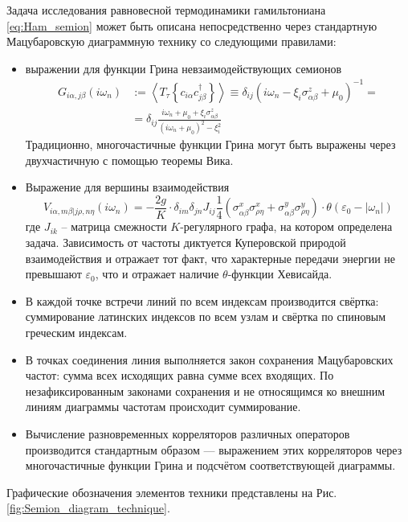 Задача исследования равновесной термодинамики гамильтониана \eqref{eq:Ham_semion} может быть  описана непосредственно через стандартную Мацубаровскую диаграммную технику \cite{AGD} со следующими правилами:
\begin{itemize}
	\item выражении для функции Грина невзаимодействующих семионов
	\begin{equation}
	\label{eq:Semion_Green_function}
	\begin{split}
		G_{i\alpha,j\beta}(i\omega_n) & := \left\langle T_\tau \left\{ c_{i\alpha} c^\dagger_{j\beta} \right\} \right\rangle 
		\equiv \delta_{ij} \left( i\omega_n - \xi_i \sigma^z_{\alpha\beta} + \mu_0 \right)^{-1} = \\ & = \delta_{ij} \frac{ i\omega_n +\mu_0 + \xi_i \sigma^z_{\alpha\beta} }{ \left( i\omega_n +\mu_0 \right)^2 - \xi_i^2 }
	\end{split}
	\end{equation}Традиционно, многочастичные функции Грина могут быть выражены через двухчастичную с помощью теоремы Вика.
	
	\item Выражение для вершины взаимодействия
	\begin{equation}
		\label{eq:Semion_interaction_vertex}
		V_{i\alpha, m\beta|j\rho, n\eta}(i\omega_n) = - \frac{2 g}{K} \cdot \delta_{im} \delta_{jn} J_{ij} \frac{1}{4} (\sigma^x_{\alpha \beta} \sigma^x_{\rho \eta} + \sigma^y_{\alpha \beta} \sigma^y_{\rho \eta}) \cdot \theta\left( \varepsilon_0 - |\omega_n| \right)
	\end{equation}
	где $J_{ik}$ -- матрица смежности $K$-регулярного графа, на котором определена задача. Зависимость от частоты диктуется Куперовской природой взаимодействия и отражает тот факт, что характерные передачи энергии не превышают $\varepsilon_0$, что и отражает наличие $\theta$-функции Хевисайда.
	
	\item В каждой точке встречи линий по всем индексам производится свёртка: суммирование латинских индексов по всем узлам и свёртка по спиновым греческим индексам.
	
	\item В точках соединения линия выполняется закон сохранения Мацубаровских частот: сумма всех исходящих равна сумме всех входящих. По незафиксированным законами сохранения и не относящимся ко внешним линиям диаграммы частотам происходит суммирование.
	
	\item Вычисление разновременных корреляторов различных операторов производится стандартным образом --- выражением этих корреляторов через многочастичные функции Грина и подсчётом соответствующей диаграммы.
\end{itemize}
Графические обозначения элементов техники представлены на Рис. \ref{fig:Semion_diagram_technique}.

